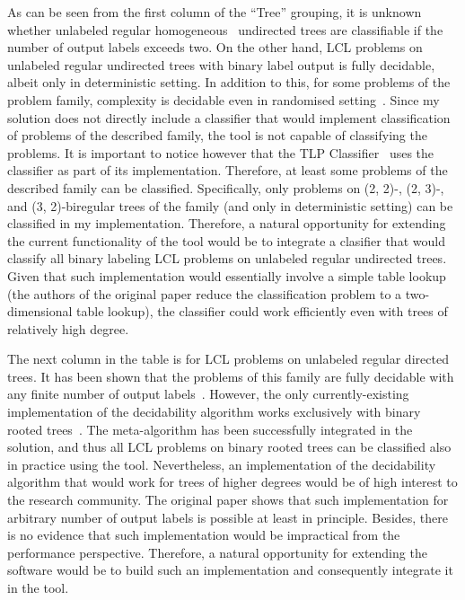 As can be seen from the first column of the ``Tree'' grouping, it is unknown whether
unlabeled regular homogeneous~\cite{BalliuHomogeneous}
undirected trees are classifiable if the number of
output labels exceeds two. On the other hand, LCL problems on
unlabeled regular undirected trees with binary label output is fully decidable, albeit
only in deterministic setting. In addition to this, for some problems of the problem family,
complexity is decidable even in randomised setting~\cite{Balliu2019c}.
Since my solution does not directly include a classifier that would implement
classification of problems of the described family, the tool is not capable of
classifying the problems. It is important to notice however that the TLP
Classifier~\cite{Rocher2020clas} uses the classifier as part of its implementation.
Therefore, at least some problems of the described family can be classified. Specifically,
only problems on (2, 2)-, (2, 3)-, and (3, 2)-biregular trees of the family
(and only in deterministic setting) can be classified in my implementation.
Therefore, a natural opportunity for extending the current functionality of the tool
would be to integrate a clasifier that would classify all binary labeling LCL problems
on unlabeled regular undirected trees. Given that such implementation would
essentially involve a simple table lookup (the authors of the original paper
reduce the classification problem to a two-dimensional table lookup), the
classifier could work efficiently even with trees of relatively high degree.

The next column in the table is for LCL problems on unlabeled regular directed
trees. It has been shown that the problems of this family are fully decidable
with any finite number of output labels~\cite{Balliu2021}. However, the
only currently-existing implementation of the decidability algorithm
works exclusively with binary rooted trees~\cite{Studeny2021}. The
meta-algorithm has been successfully integrated in the solution, and
thus all LCL problems on binary rooted trees can be classified also in
practice using the tool. Nevertheless, an implementation of the
decidability algorithm that would work for trees of higher degrees
would be of high interest to the research community. The original
paper shows that such implementation for arbitrary number of output
labels is possible at least in principle. Besides, there is no
evidence that such implementation would be impractical from the
performance perspective. Therefore, a natural opportunity for
extending the software would be to build such an implementation and
consequently integrate it in the tool.

